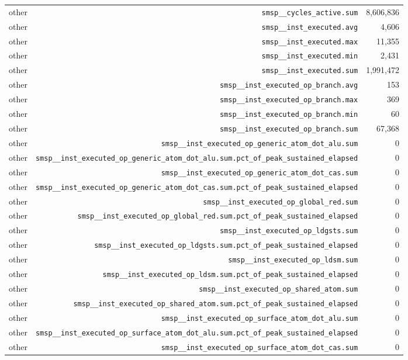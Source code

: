 \begin{table}[h]
\begin{tabular}{|l|r|r|}
other & \texttt{smsp__cycles_active.sum} & 8,606,836 \\
other & \texttt{smsp__inst_executed.avg} & 4,606 \\
other & \texttt{smsp__inst_executed.max} & 11,355 \\
other & \texttt{smsp__inst_executed.min} & 2,431 \\
other & \texttt{smsp__inst_executed.sum} & 1,991,472 \\
other & \texttt{smsp__inst_executed_op_branch.avg} & 153 \\
other & \texttt{smsp__inst_executed_op_branch.max} & 369 \\
other & \texttt{smsp__inst_executed_op_branch.min} & 60 \\
other & \texttt{smsp__inst_executed_op_branch.sum} & 67,368 \\
other & \texttt{smsp__inst_executed_op_generic_atom_dot_alu.sum} & 0 \\
other & \texttt{smsp__inst_executed_op_generic_atom_dot_alu.sum.pct_of_peak_sustained_elapsed} & 0 \\
other & \texttt{smsp__inst_executed_op_generic_atom_dot_cas.sum} & 0 \\
other & \texttt{smsp__inst_executed_op_generic_atom_dot_cas.sum.pct_of_peak_sustained_elapsed} & 0 \\
other & \texttt{smsp__inst_executed_op_global_red.sum} & 0 \\
other & \texttt{smsp__inst_executed_op_global_red.sum.pct_of_peak_sustained_elapsed} & 0 \\
other & \texttt{smsp__inst_executed_op_ldgsts.sum} & 0 \\
other & \texttt{smsp__inst_executed_op_ldgsts.sum.pct_of_peak_sustained_elapsed} & 0 \\
other & \texttt{smsp__inst_executed_op_ldsm.sum} & 0 \\
other & \texttt{smsp__inst_executed_op_ldsm.sum.pct_of_peak_sustained_elapsed} & 0 \\
other & \texttt{smsp__inst_executed_op_shared_atom.sum} & 0 \\
other & \texttt{smsp__inst_executed_op_shared_atom.sum.pct_of_peak_sustained_elapsed} & 0 \\
other & \texttt{smsp__inst_executed_op_surface_atom_dot_alu.sum} & 0 \\
other & \texttt{smsp__inst_executed_op_surface_atom_dot_alu.sum.pct_of_peak_sustained_elapsed} & 0 \\
other & \texttt{smsp__inst_executed_op_surface_atom_dot_cas.sum} & 0 \\

\end{tabular}
\end{table}
